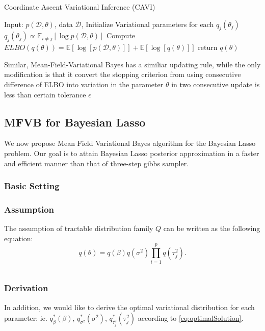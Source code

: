 \begin{algorithm}
	\caption{Coordinate Ascent Variational Inference (CAVI)}
	\begin{algorithmic}[1]
		
		\State Input: $p(\mathcal{D},\theta)$, data $\mathcal{D}$, Initialize Variational parameters for each $q_j(\theta_j)$
		\State $q_j(\theta_j) \propto \mathbb{E}_{i\neq j}[\log p(\mathcal{D},\theta)]$
		\EndFor
		\State Compute $ELBO(q(\theta)) = \mathbb{E}[\log[p(\mathcal{D},\theta)]] + \mathbb{E}[\log[q(\theta)]]$
		\EndWhile 
		\State return $q(\theta)$
		
		
		
	\end{algorithmic}
\end{algorithm}
Similar, Mean-Field-Variational Bayes has a similiar updating rule, while the only modification is that it convert the stopping criterion from using consecutive difference of ELBO into variation in the parameter $\theta$ in two consecutive update is less than certain tolerance $\epsilon$

\newpage
\subsection{MFVB for Bayesian Lasso}
We now propose Mean Field Variational Bayes algorithm for the Bayesian Lasso problem. Our goal is to attain Bayesian Lasso posterior approximation in a faster and efficient manner than that of three-step gibbs sampler.
\subsubsection{Basic Setting}

\subsubsection{Assumption}
The assumption of tractable distribution family $Q$ can be written as the following equation:
\begin{equation}
	q(\theta) = q(\beta)q(\sigma^2)\prod_{i=1}^p q(\tau_j^2).
\end{equation}

$$$$
\subsubsection{Derivation}
In addition, we would like to derive the optimal variational distribution for each parameter: ie. $q_{\beta}^*(\beta)$, $q_{\sigma^2}^*(\sigma^2)$, $q_{\tau_j^2}^*(\tau_j^2)$ according to \autoref{eq:optimalSolution}.\\
